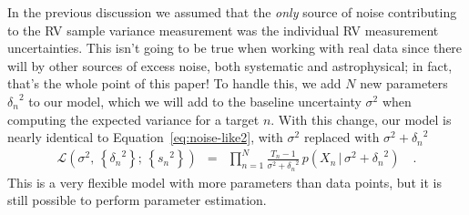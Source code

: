 \documentclass[modern, letterpaper]{aastex63}
\begin{document}
In the previous discussion we assumed that the \emph{only} source of noise contributing to the RV sample variance measurement was the individual RV measurement uncertainties.
This isn't going to be true when working with real data since there will by other sources of excess noise, both systematic and astrophysical; in fact, that's the whole point of this paper!
To handle this, we add $N$ new parameters ${\delta_n}^2$ to our model, which we will add to the baseline uncertainty $\sigma^2$ when computing the expected variance for a target $n$.
With this change, our model is nearly identical to Equation~\ref{eq:noise-like2}, with $\sigma^2$ replaced with $\sigma^2 + {\delta_n}^2$
\begin{eqnarray}
  \label{eq:noise-like3}
  \mathcal{L}(\sigma^2,\,\left\{{\delta_n}^2\right\};\,\left\{{s_n}^2\right\}) &=& \prod_{n=1}^N \frac{T_n - 1}{\sigma^2 + {\delta_n}^2}\,p(X_n\,|\,\sigma^2 + {\delta_n}^2) \quad.
\end{eqnarray}
This is a very flexible model with more parameters than data points, but it is still possible to perform parameter estimation.


\end{document}
